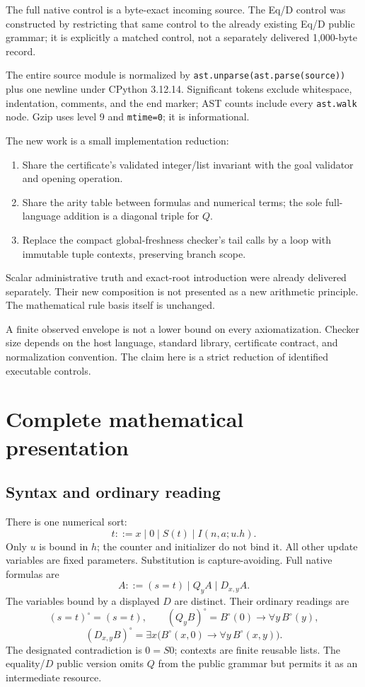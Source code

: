 \documentclass[11pt]{article}
\theoremstyle{definition}\newtheorem{definition}[theorem]{Definition}
\theoremstyle{remark}\newtheorem{remark}[theorem]{Remark}
\begin{document}
\begin{center}\end{center}

The full native control is a byte-exact incoming source. The Eq/D control
was constructed by restricting that same control to the already existing
Eq/D public grammar; it is explicitly a matched control, not a separately
delivered 1,000-byte record.

The entire source module is normalized by
\texttt{ast.unparse(ast.parse(source))} plus one newline under CPython
3.12.14. Significant tokens exclude whitespace, indentation, comments,
and the end marker; AST counts include every \texttt{ast.walk} node.
Gzip uses level 9 and \texttt{mtime=0}; it is informational.

The new work is a small implementation reduction:
\begin{enumerate}
\item Share the certificate's validated integer/list invariant with the
goal validator and opening operation.
\item Share the arity table between formulas and numerical terms; the
sole full-language addition is a diagonal triple for $Q$.
\item Replace the compact global-freshness checker's tail calls by a
loop with immutable tuple contexts, preserving branch scope.
\end{enumerate}
Scalar administrative truth and exact-root introduction were already
delivered separately. Their new composition is not presented as a new
arithmetic principle. The mathematical rule basis itself is unchanged.

A finite observed envelope is not a lower bound on every axiomatization.
Checker size depends on the host language, standard library, certificate
contract, and normalization convention. The claim here is a strict
reduction of identified executable controls.

\section{Complete mathematical presentation}

\subsection{Syntax and ordinary reading}

There is one numerical sort:
\[
 t ::= x\mid0\mid S(t)\mid I(n,a;u.h).
\]
Only $u$ is bound in $h$; the counter and initializer do not bind it.
All other update variables are fixed parameters. Substitution is
capture-avoiding. Full native formulas are
\[
 A ::= (s=t)\mid Q_yA\mid D_{x,y}A.
\]
The variables bound by a displayed $D$ are distinct. Their ordinary
readings are
\[
(s=t)^\circ=(s=t),\qquad
(Q_yB)^\circ=B^\circ(0)\to\forall y\,B^\circ(y),
\]
\[
(D_{x,y}B)^\circ=
 \exists x\bigl(B^\circ(x,0)\to\forall y\,B^\circ(x,y)\bigr).
\tag{Reading}\label{main:reading}
\]
The designated contradiction is $0=S0$; contexts are finite reusable
lists. The equality/$D$ public version omits $Q$ from the public grammar
but permits it as an intermediate resource.
\end{document}
